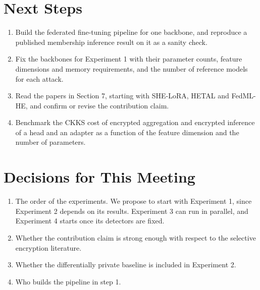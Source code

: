 \documentclass[10pt,a4paper]{article}
\begin{document}
\section{Next Steps}

\begin{enumerate}
\item Build the federated fine-tuning pipeline for one backbone, and reproduce a published membership inference result on it as a sanity check.
\item Fix the backbones for Experiment 1 with their parameter counts, feature dimensions and memory requirements, and the number of reference models for each attack.
\item Read the papers in Section 7, starting with SHE-LoRA, HETAL and FedML-HE, and confirm or revise the contribution claim.
\item Benchmark the CKKS cost of encrypted aggregation and encrypted inference of a head and an adapter as a function of the feature dimension and the number of parameters.
\end{enumerate}

\section{Decisions for This Meeting}

\begin{enumerate}
\item The order of the experiments. We propose to start with Experiment 1, since Experiment 2 depends on its results. Experiment 3 can run in parallel, and Experiment 4 starts once its detectors are fixed.
\item Whether the contribution claim is strong enough with respect to the selective encryption literature.
\item Whether the differentially private baseline is included in Experiment 2.
\item Who builds the pipeline in step 1.
\end{enumerate}
\end{document}
